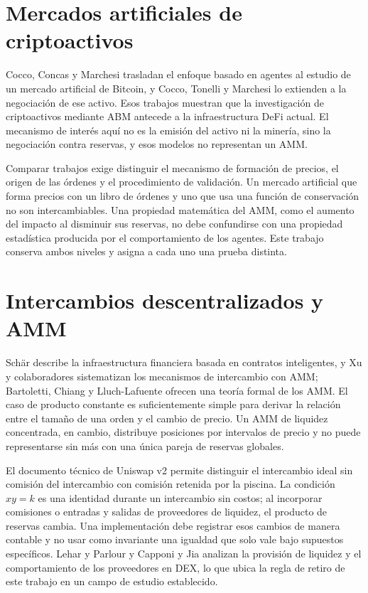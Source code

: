 \section{Mercados artificiales de criptoactivos}

Cocco, Concas y Marchesi \cite{cocco2017artificial} trasladan el enfoque basado en agentes al estudio de un mercado artificial de Bitcoin, y Cocco, Tonelli y Marchesi \cite{cocco2019agent} lo extienden a la negociación de ese activo. Esos trabajos muestran que la investigación de criptoactivos mediante ABM antecede a la infraestructura DeFi actual. El mecanismo de interés aquí no es la emisión del activo ni la minería, sino la negociación contra reservas, y esos modelos no representan un AMM.

Comparar trabajos exige distinguir el mecanismo de formación de precios, el origen de las órdenes y el procedimiento de validación. Un mercado artificial que forma precios con un libro de órdenes y uno que usa una función de conservación no son intercambiables. Una propiedad matemática del AMM, como el aumento del impacto al disminuir sus reservas, no debe confundirse con una propiedad estadística producida por el comportamiento de los agentes. Este trabajo conserva ambos niveles y asigna a cada uno una prueba distinta.

\section{Intercambios descentralizados y AMM}

Schär \cite{schar2021defi} describe la infraestructura financiera basada en contratos inteligentes, y Xu y colaboradores \cite{xu2023sok} sistematizan los mecanismos de intercambio con AMM; Bartoletti, Chiang y Lluch-Lafuente \cite{bartoletti2022theory} ofrecen una teoría formal de los AMM. El caso de producto constante es suficientemente simple para derivar la relación entre el tamaño de una orden y el cambio de precio. Un AMM de liquidez concentrada, en cambio, distribuye posiciones por intervalos de precio y no puede representarse sin más con una única pareja de reservas globales.

El documento técnico de Uniswap v2 \cite{adams2020uniswap} permite distinguir el intercambio ideal sin comisión del intercambio con comisión retenida por la piscina. La condición $xy=k$ es una identidad durante un intercambio sin costos; al incorporar comisiones o entradas y salidas de proveedores de liquidez, el producto de reservas cambia. Una implementación debe registrar esos cambios de manera contable y no usar como invariante una igualdad que solo vale bajo supuestos específicos. Lehar y Parlour \cite{lehar2025uniswap} y Capponi y Jia \cite{capponi2025liquidity} analizan la provisión de liquidez y el comportamiento de los proveedores en DEX, lo que ubica la regla de retiro de este trabajo en un campo de estudio establecido.

